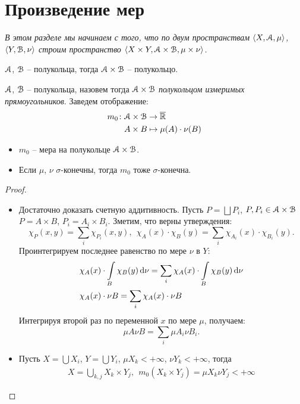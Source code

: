 \section{Произведение мер}

\textit{В этом разделе мы начинаем с того, что по двум пространствам
$\langle X, \mathcal{A}, \mu \rangle$, $\langle Y, \mathcal{B}, \nu \rangle$ строим пространство
$\langle X \times Y, \mathcal{A} \times \mathcal{B}, \mu \times \nu \rangle$.}

\begin{lemma}
    $\mathcal{A}$, $\mathcal{B}$ -- полукольца, тогда $\mathcal{A} \times \mathcal{B}$ -- полукольцо.
\end{lemma}

\begin{definition}
    $\mathcal{A}$, $\mathcal{B}$ -- полукольца, назовем тогда $\mathcal{A} \times \mathcal{B}$ \textit{полукольцом
    измеримых прямоугольников}. Заведем отображение:
\begin{align*}
    m_0 \colon &\mathcal{A} \times \mathcal{B} \to \overline{\mathbb{R}} \\
               &A \times B \mapsto \mu(A) \cdot \nu(B)
\end{align*}
\end{definition}

\begin{theorem}
    \enewline
    \begin{itemize}
        \item $m_0$ -- мера на полукольце $\mathcal{A} \times \mathcal{B}$.
        \item Если $\mu$, $\nu$ $\sigma$-конечны, тогда $m_0$ тоже $\sigma$-конечна.
    \end{itemize} 
\end{theorem}
\begin{proof}
    \enewline
    \begin{itemize}
        \item Достаточно доказать счетную аддитивность. Пусть $P = \bigsqcup{P_i}$, $P, P_i \in \mathcal{A} \times \mathcal{B}$
            $P = A \times B$, $P_i = A_i \times B_i$. Зметим, что верны утверждения:
\[
    \chi_P(x, y) = \sum_{i}{\chi_{P_i}(x, y)},~~
    \chi_A(x) \cdot \chi_B(y) = \sum_{i}{\chi_{A_i}(x) \cdot \chi_{B_i}(y)}
.\]            
            Проинтегрируем последнее равенство по мере $\nu$ в $Y$:
        \begin{align*}
            &\chi_A(x) \cdot \int\limits_B{\chi_B(y) \,\mathrm{d}\nu} = \sum_{i}{\chi_A(x) \cdot \int\limits_B{\chi_B(y) \,\mathrm{d}\nu}} \\
            &\chi_A(x) \cdot \nu{B} = \sum_{i}{\chi_A(x) \cdot \nu{B}}
        \end{align*}
            Интегрируя второй раз по переменной $x$ по мере $\mu$, получаем:
\[
    \mu{A} \nu{B} = \sum_{i}{\mu{A_i} \nu{B_i}}
.\]
        \item Пусть $X = \bigcup{X_i}$, $Y = \bigcup{Y_i}$, $\mu{X_k} < +\infty$, $\nu{Y_k} < +\infty$, 
            тогда 
        \begin{align*}
            X = \bigcup_{k, j}{X_k \times Y_j},~~ m_0(X_k \times Y_j) = \mu{X_k} \nu{Y_j} < +\infty
        \end{align*}
    \end{itemize}
\end{proof}

